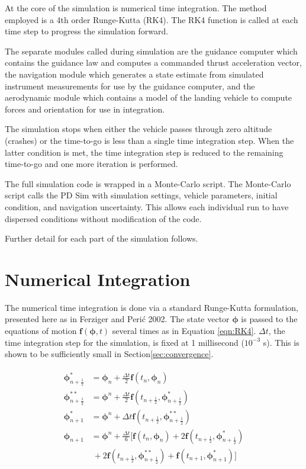 At the core of the simulation is numerical time integration. The method employed is a 4th order Runge-Kutta (RK4). The RK4 function is called at each time step to progress the simulation forward.

The separate modules called during simulation are the guidance computer which contains the guidance law and computes a commanded thrust acceleration vector, the navigation module which generates a state estimate from simulated instrument measurements for use by the guidance computer, and the aerodynamic module which contains a model of the landing vehicle to compute forces and orientation for use in integration.

The simulation stops when either the vehicle passes through zero altitude (crashes) or the time-to-go is less than a single time integration step. When the latter condition is met, the time integration step is reduced to the remaining time-to-go and one more iteration is performed.

The full simulation code is wrapped in a Monte-Carlo script. The Monte-Carlo script calls the PD Sim with simulation settings, vehicle parameters, initial condition, and navigation uncertainty. This allows each individual run to have dispersed conditions without modification of the code.

Further detail for each part of the simulation follows.

\section{Numerical Integration} \label{sec:RK4}
The numerical time integration is done via a standard Runge-Kutta formulation, presented here as in Ferziger and Peri\'c 2002\:\cite{FERZIGER}. The state vector $\bm{\phi}$ is passed to the equations of motion $\bm{f}(\bm{\phi},t)$ several times as in Equation \ref{eqn:RK4}. $\Delta t$, the time integration step for the simulation, is fixed at 1 millisecond ($10^{-3}$ s). This is shown to be sufficiently small in Section\:\ref{sec:convergence}.

\begin{align}
\label{eqn:RK4}
\begin{split}
\bm{\phi}_{n+\frac{1}{2}}^* &= \bm{\phi}_n + \frac{\Delta t}{2} \bm{f}(t_n,\bm{\phi}_n)\\
\bm{\phi}_{n+\frac{1}{2}}^{**} &= \bm{\phi}^n + \frac{\Delta t}{2}  \bm{f}(t_{n+\frac{1}{2}},\bm{\phi}^*_{n+\frac{1}{2}})\\
\bm{\phi}_{n+1}^* &= \bm{\phi}^n + \Delta t  \bm{f}(t_{n+\frac{1}{2}},\bm{\phi}^{**}_{n+\frac{1}{2}})\\
\bm{\phi}_{n+1} &= \bm{\phi}^n + \frac{\Delta t}{6}
[\bm{f}(t_n,\bm{\phi}_{n})
+ 2\bm{f}(t_{n+\frac{1}{2}},\bm{\phi}^*_{n+\frac{1}{2}})\\
&\:+ 2\bm{f}(t_{n+\frac{1}{2}},\bm{\phi}^{**}_{n+\frac{1}{2}})
+ \bm{f}(t_{n+1},\bm{\phi}_{n+1}^*)]
\end{split}
\end{align}


